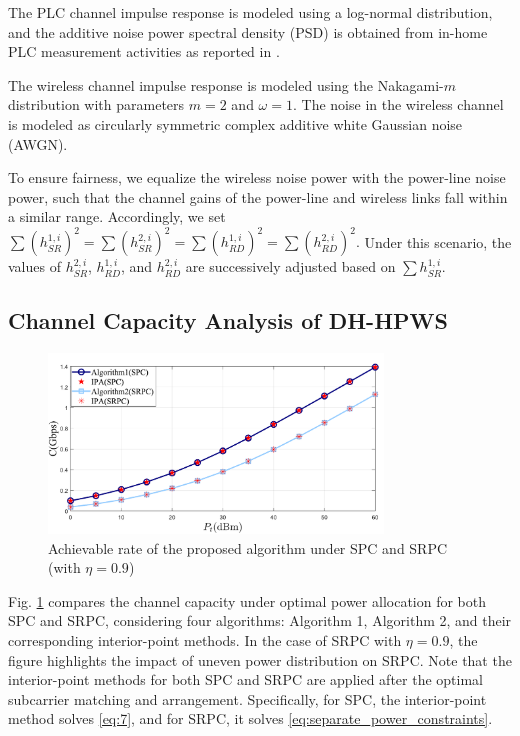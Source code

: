 \documentclass[lettersize,journal]{IEEEtran}
\begin{document}
	The PLC channel impulse response is modeled using a log-normal distribution, and the additive noise power spectral density (PSD) is obtained from in-home PLC measurement activities as reported in \cite{7327147}.
	
	The wireless channel impulse response is modeled using the Nakagami-$m$ distribution with parameters $m = 2$ and $\omega = 1$. The noise in the wireless channel is modeled as circularly symmetric complex additive white Gaussian noise (AWGN).
	
	To ensure fairness, we equalize the wireless noise power with the power-line noise power, such that the channel gains of the power-line and wireless links fall within a similar range. Accordingly, we set
	\(
	\sum (h_{SR}^{1,i})^2 = \sum (h_{SR}^{2,i})^2 = \sum (h_{RD}^{1,i})^2 = \sum (h_{RD}^{2,i})^2.
	\)
	Under this scenario, the values of \( h_{SR}^{2,i} \), \( h_{RD}^{1,i} \), and \( h_{RD}^{2,i} \) are successively adjusted based on \( \sum h_{SR}^{1,i} \).
	
	\subsection{Channel Capacity Analysis of DH-HPWS}
	\begin{figure}[!t]
		\centering
		\includegraphics[width=3.5in]{sulv.pdf}
		\caption{Achievable rate of the proposed algorithm under SPC and SRPC (with \( \eta = 0.9 \))}
		\label{fig_sulv}
	\end{figure}
	
	Fig. \ref{fig_sulv} compares the channel capacity under optimal power allocation for both SPC and SRPC, considering four algorithms: Algorithm 1, Algorithm 2, and their corresponding interior-point methods. In the case of SRPC with \( \eta = 0.9 \), the figure highlights the impact of uneven power distribution on SRPC. Note that the interior-point methods for both SPC and SRPC are applied after the optimal subcarrier matching and arrangement. Specifically, for SPC, the interior-point method solves \eqref{eq:7}, and for SRPC, it solves \eqref{eq:separate_power_constraints}.
	
\end{document}
